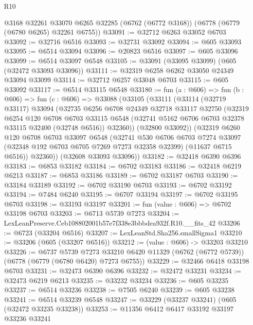 \begin{lexlean}{R10}
\begin{coremodule}
    @3168
    @32261
    @33070
    @6265
    @32285
    (@6762 (@6772 @3168))
    (@6778 (@6779 (@6780 @6265) @32261 @6755))
@33091 := @32712 @6263 @33052 @6703
@33092 := @32716 @6516
@33093 := @32731 @33092
@33094 := @605 @33093
@33095 := @6514 @33094
@33096 := @20823 @6516
@33097 := @605 @33096
@33099 := @6514 @33097 @6548
@33105 := @33091 (@33095 @33099) (@605 (@32472 @33093 @33096))
@33111 := @32319 @6258 @6262 @33050 @24349 @33094 @33099
@33114 := @32712 @6257 @33048 @6703
@33115 := @605 @33092
@33117 := @6514 @33115 @6548
@33180 := fun (a : @606) =>
  fun (b : @606) =>
  fun (c : @606) =>
  @33088
    (@33105
      (@33111
        (@33114
          (@32719 @33117)
          @33094
          (@32735
            @6256
            @6708
            @24349
            @32718
            @33117
            @32750
            (@32319
              @6254
              @120
              @6708
              @6703
              @33115
              @6548
              (@32741 @5162 @6706 @6703 @32378 @33115 @32400 (@32748 @6516))
              @32360))
          (@32800 @33092))
        (@32319
          @6260
          @120
          @6708
          @6703
          @33097
          @6548
          (@32741
            @530
            @6706
            @6703
            @7274
            @33097
            (@32348 @192 @6703 @6705 @7269 @7273 @32358 @32399)
            (@11637 @6715 @6516))
          @32360))
      (@32608 @33093 @33096))
@33182 := @32418 @6390 @6396
@33183 := @6853 @33182
@33184 := @6702 @33183
@33186 := @32418 @6219 @6213
@33187 := @6853 @33186
@33189 := @6702 @33187 @6703
@33190 := @33184 @33189
@33192 := @6702 @33190 @6703
@33193 := @6702 @33192
@33194 := @7484 @6240
@33195 := @6707 @33194
@33197 := @6702 @33195 @6703
@33198 := @33193 @33197
@33201 := fun (value : @606) => @6702 @33198 @6703
@33203 := @6713 @5739 @7273
@33204 := LexLeanPreserve.Ceb108802001b57e7f338e3bbbdea932f.R10.__fits_42
@33206 := @6723 (@33204 @6516)
@33207 := LexLeanStd.Sha256.smallSigma1
@33210 := @33206 (@605 (@33207 @6516))
@33212 := (value : @606) -> @33203 @33210
@33226 := @6737
    @5739
    @7273
    @33210
    @6420
    @11329
    (@6762 (@6772 @5739))
    (@6778 (@6779 (@6780 @6420) @7273 @6755))
@33229 := @32466 @6418 @33198 @6703
@33231 := @32473 @6390 @6396
@33232 := @32472 @33231
@33234 := @32473 @6219 @6213
@33235 := @33232 @33234
@33236 := @605 @33235
@33237 := @6514 @33236
@33238 := @7505 @6240
@33239 := @605 @33238
@33241 := @6514 @33239 @6548
@33247 := @33229 (@33237 @33241) (@605 (@32472 @33235 @33238))
@33253 := @11356 @6412 @6417 @33192 @33197 @33236 @33241

\end{coremodule}
\end{lexlean}
